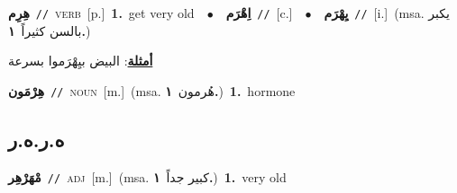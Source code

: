 \documentclass[10pt,a4paper,twoside]{article} %
\begin{document}
\begin{multicols}{2}
{\setlength\topsep{0pt}\textbf{\foreignlanguage{arabic}{هِرِم}}\ {\color{gray}\texttt{//}\color{black}}\ \textsc{verb}\ [p.]\ \textbf{1.}~get very old\ \ $\bullet$\ \ \setlength\topsep{0pt}\textbf{\foreignlanguage{arabic}{اِهْرَم}}\ {\color{gray}\texttt{//}\color{black}}\ [c.]\ \ $\bullet$\ \ \setlength\topsep{0pt}\textbf{\foreignlanguage{arabic}{يِهْرَم}}\ {\color{gray}\texttt{//}\color{black}}\ [i.]\ \color{gray}(msa. \foreignlanguage{arabic}{يكبر بالسن كثيراً}~\foreignlanguage{arabic}{\textbf{١.}})\color{black}\  \begin{flushright}\color{gray}\foreignlanguage{arabic}{\textbf{\underline{\foreignlanguage{arabic}{أمثلة}}}: البيض بيِهْرَموا بسرعة}\end{flushright}\color{black}} \vspace{2mm}

{\setlength\topsep{0pt}\textbf{\foreignlanguage{arabic}{هِرْمَون}}\ {\color{gray}\texttt{//}\color{black}}\ \textsc{noun}\ [m.]\ \color{gray}(msa. \foreignlanguage{arabic}{هُرمون}~\foreignlanguage{arabic}{\textbf{١.}})\color{black}\ \textbf{1.}~hormone\ } \vspace{2mm}

\vspace{-3mm}
\subsection*{\color{blue}\foreignlanguage{arabic}{ه.ر.ه.ر}\color{blue}{}} 

{\setlength\topsep{0pt}\textbf{\foreignlanguage{arabic}{مْهَرْهِر}}\ {\color{gray}\texttt{//}\color{black}}\ \textsc{adj}\ [m.]\ \color{gray}(msa. \foreignlanguage{arabic}{كبير جداً}~\foreignlanguage{arabic}{\textbf{١.}})\color{black}\ \textbf{1.}~very old\ } \vspace{2mm}


\end{multicols}
\end{document}
